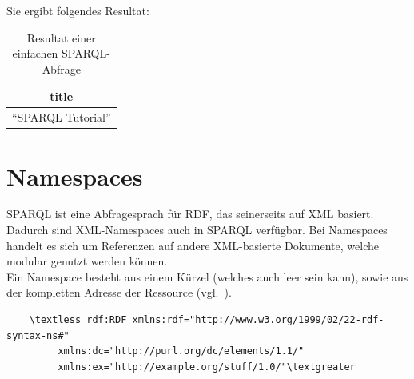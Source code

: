 Sie ergibt folgendes Resultat:
\noindent\hspace*{15mm}
\begin{table}[h]
    \centering
    \begin{tabular}{|l|}
        \hline
        \multicolumn{1}{|c|}{\textbf{title}} \\ \hline
        ``SPARQL Tutorial''                    \\ \hline
    \end{tabular}
    \caption{Resultat einer einfachen SPARQL-Abfrage\protect\footnotemark}
\end{table}

\section{Namespaces}
\label{sec:sparql_namespaces}

SPARQL ist eine Abfragesprach für RDF, das seinerseits auf XML basiert. Dadurch sind XML-Namespaces auch in SPARQL verfügbar. Bei Namespaces handelt es sich um Referenzen auf andere XML-basierte Dokumente, welche modular genutzt werden können.\\
Ein Namespace besteht aus einem Kürzel (welches auch leer sein kann), sowie aus der kompletten Adresse der Ressource (vgl.~\cite[2.1 Introduction]{w3rdf_syntax}).

\begin{lstlisting}
    \textless rdf:RDF xmlns:rdf="http://www.w3.org/1999/02/22-rdf-syntax-ns#"
         xmlns:dc="http://purl.org/dc/elements/1.1/"
         xmlns:ex="http://example.org/stuff/1.0/"\textgreater
\end{lstlisting}

